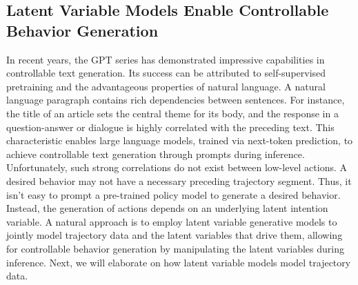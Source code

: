 \subsection{Latent Variable Models Enable Controllable Behavior Generation}
In recent years, the GPT series \citep{gpt1, gpt2, gpt3} has demonstrated impressive capabilities in controllable text generation. Its success can be attributed to self-supervised pretraining and the advantageous properties of natural language. A natural language paragraph contains rich dependencies between sentences. For instance, the title of an article sets the central theme for its body, and the response in a question-answer or dialogue is highly correlated with the preceding text. This characteristic enables large language models, trained via next-token prediction, to achieve controllable text generation through prompts during inference. 
Unfortunately, such strong correlations do not exist between low-level actions. A desired behavior may not have a necessary preceding trajectory segment. Thus, it isn't easy to prompt a pre-trained policy model to generate a desired behavior. Instead, the generation of actions depends on an underlying latent intention variable. A natural approach is to employ latent variable generative models to jointly model trajectory data and the latent variables that drive them, allowing for controllable behavior generation by manipulating the latent variables during inference. 
Next, we will elaborate on how latent variable models model trajectory data. 

